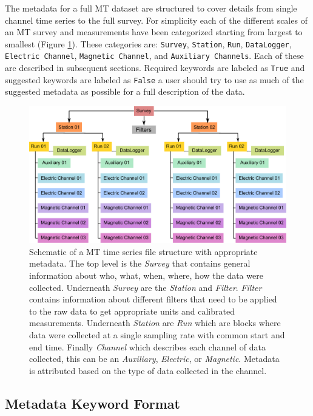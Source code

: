 \documentclass{article}
\begin{document}
The metadata for a full MT dataset are structured to cover details from single channel time series to the full survey. For simplicity each of the different scales of an MT survey and measurements have been categorized starting from largest to smallest (Figure \ref{fig:example}). These categories are: \verb|Survey|, \verb|Station|, \verb|Run|, \verb|DataLogger|, \verb|Electric Channel|, \verb|Magnetic Channel|, and \verb|Auxiliary Channels|. Each of these are described in subsequent sections.  Required keywords are labeled as \verb|True| and suggested keywords are labeled as \verb|False| a user should try to use as much of the suggested metadata as possible for a full description of the data.  

\begin{figure}[htb!]
	\centering
	\includegraphics[height=.525\textwidth]{example_mt_file_structure.pdf}
	\caption{Schematic of a MT time series file structure with appropriate metadata. The top level is the \textit{Survey} that contains general information about who, what, when, where, how the data were collected.  Underneath \textit{Survey} are the \textit{Station} and \textit{Filter}.  \textit{Filter} contains information about different filters that need to be applied to the raw data to get appropriate units and calibrated measurements.  Underneath \textit{Station} are \textit{Run} which are blocks where data were collected at a single sampling rate with common start and end time. Finally \textit{Channel} which describes each channel of data collected, this can be an \textit{Auxiliary}, \textit{Electric}, or \textit{Magnetic}.  Metadata is attributed based on the type of data collected in the channel.}
	\label{fig:example}
\end{figure}

\subsection{Metadata Keyword Format}
\end{document}
